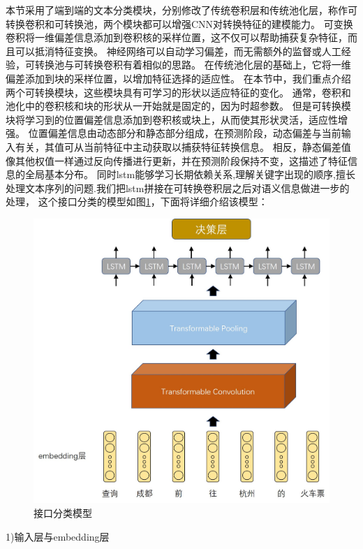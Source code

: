 本节采用了端到端的文本分类模块，分别修改了传统卷积层和传统池化层，称作可转换卷积和可转换池，两个模块都可以增强CNN对转换特征的建模能力。
可变换卷积将一维偏差信息添加到卷积核的采样位置，这不仅可以帮助捕获复杂特征，而且可以抵消特征变换。
神经网络可以自动学习偏差，而无需额外的监督或人工经验，可转换池与可转换卷积有着相似的思路。
在传统池化层的基础上，它将一维偏差添加到块的采样位置，以增加特征选择的适应性。
在本节中，我们重点介绍两个可转换模块，这些模块具有可学习的形状以适应特征的变化。 
通常，卷积和池化中的卷积核和块的形状从一开始就是固定的，因为时超参数。 但是可转换模块将学习到的位置偏差信息添加到卷积核或块上，从而使其形状灵活，适应性增强。 
位置偏差信息由动态部分和静态部分组成，在预测阶段，动态偏差与当前输入有关，其值可从当前特征中主动获取以捕获特征转换信息。 
相反，静态偏差值像其他权值一样通过反向传播进行更新，并在预测阶段保持不变，这描述了特征信息的全局基本分布。
同时lstm能够学习长期依赖关系,理解关键字出现的顺序,擅长处理文本序列的问题.我们把lstm拼接在可转换卷积层之后对语义信息做进一步的处理，
这个接口分类的模型如图\ref{fig:tran-cnn-lstm}，下面将详细介绍该模型：

\begin{figure}[htbp]
  \centering
  \includegraphics[scale=0.5]{./images/tran-cnn-lstm.jpg}
  \caption{接口分类模型}
  \label{fig:tran-cnn-lstm}
\end{figure}

1)输入层与embedding层

